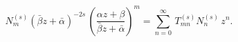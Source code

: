 \begin{equation}
N_m^{(s)}(\bar{\beta} z+\bar{\alpha})^{-2s}\,
\left(\frac{\alpha z+\beta}{\bar{\beta} z+\bar{\alpha}}\right)^m
=\sum_{n=0}^{\infty}\,T_{mn}^{(s)}N_n^{(s)}\,z^n.
\label{C_mn}
\end{equation}

